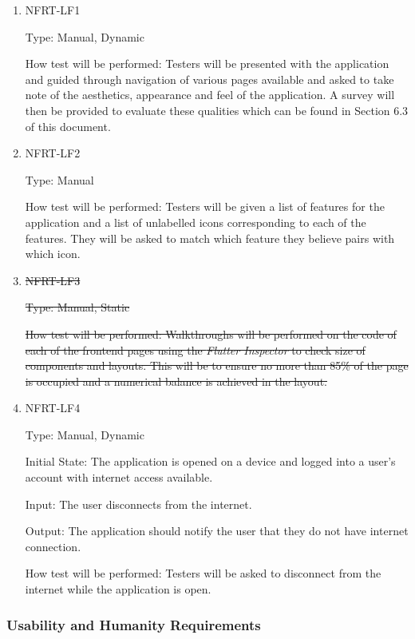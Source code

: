 \documentclass[12pt, titlepage]{article}
\begin{document}
\begin{enumerate}
  \item{NFRT-LF1\\}

  Type: Manual, Dynamic
            
  How test will be performed: Testers will be presented with the application and guided through navigation of various
  pages available and asked to take note of the aesthetics, appearance and feel of the application. A survey
  will then be provided to evaluate these qualities which can be found in Section 6.3 of this document.
            
  \item{NFRT-LF2\\}

  Type: Manual
            
  How test will be performed: Testers will be given a list of features for the application and a list of
  unlabelled icons corresponding to each of the features. They will be asked to match which feature
  they believe pairs with which icon.

  \item{\sout{NFRT-LF3\\}}

  \sout{Type: Manual, Static}

  \sout{How test will be performed: Walkthroughs will be performed on the code of each of the frontend pages
  using the \textit{Flutter Inspector} to check size of components and layouts. This will be to ensure no more than
  85\% of the page is occupied and a numerical balance is achieved in the layout.}

  \item{NFRT-LF4\\}

  Type: Manual, Dynamic

  Initial State: The application is opened on a device and logged into a user's account with internet access available.

  Input: The user disconnects from the internet.

  Output: The application should notify the user that they do not have internet connection.

  How test will be performed: Testers will be asked to disconnect from the internet while the application is open.
\end{enumerate}

\subsubsection{Usability and Humanity Requirements}
\end{document}

